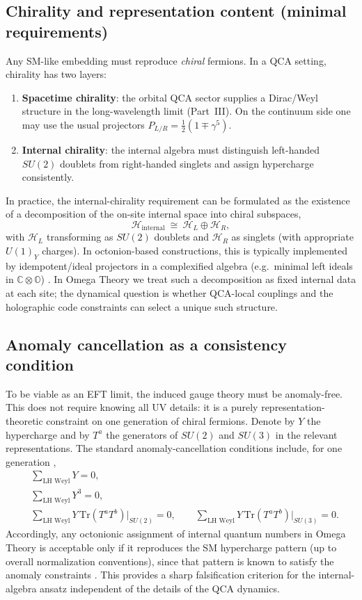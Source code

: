 \subsection{Chirality and representation content (minimal requirements)}
Any SM-like embedding must reproduce \emph{chiral} fermions. In a QCA setting, chirality has two layers:
\begin{enumerate}
    \item \textbf{Spacetime chirality}: the orbital QCA sector supplies a Dirac/Weyl structure in the long-wavelength limit (Part~III). On the continuum side one may use the usual projectors $P_{L/R}=\frac{1}{2}(1\mp\gamma^5)$.
    \item \textbf{Internal chirality}: the internal algebra must distinguish left-handed $SU(2)$ doublets from right-handed singlets and assign hypercharge consistently.
\end{enumerate}
In practice, the internal-chirality requirement can be formulated as the existence of a decomposition of the on-site internal space into chiral subspaces,
\begin{equation}
    \mathcal{H}_{\text{internal}} \ \cong\  \mathcal{H}_{L}\oplus \mathcal{H}_{R},
\end{equation}
with $\mathcal{H}_{L}$ transforming as $SU(2)$ doublets and $\mathcal{H}_{R}$ as singlets (with appropriate $U(1)_Y$ charges). In octonion-based constructions, this is typically implemented by idempotent/ideal projectors in a complexified algebra (e.g.\ minimal left ideals in $\mathbb{C}\otimes\mathbb{O}$) \cite{Furey2017}. In Omega Theory we treat such a decomposition as fixed internal data at each site; the dynamical question is whether QCA-local couplings and the holographic code constraints can select a unique such structure.

\subsection{Anomaly cancellation as a consistency condition}
To be viable as an EFT limit, the induced gauge theory must be anomaly-free. This does not require knowing all UV details: it is a purely representation-theoretic constraint on one generation of chiral fermions. Denote by $Y$ the hypercharge and by $T^a$ the generators of $SU(2)$ and $SU(3)$ in the relevant representations. The standard anomaly-cancellation conditions include, for one generation \cite{PeskinSchroeder1995},
\begin{align}
    &\sum_{\text{LH Weyl}} Y = 0, \\
    &\sum_{\text{LH Weyl}} Y^3 = 0, \\
    &\sum_{\text{LH Weyl}} Y\,\mathrm{Tr}(T^aT^b)\big|_{SU(2)} = 0,\qquad
      \sum_{\text{LH Weyl}} Y\,\mathrm{Tr}(T^aT^b)\big|_{SU(3)} = 0.
\end{align}
Accordingly, any octonionic assignment of internal quantum numbers in Omega Theory is acceptable only if it reproduces the SM hypercharge pattern (up to overall normalization conventions), since that pattern is known to satisfy the anomaly constraints \cite{PeskinSchroeder1995}. This provides a sharp falsification criterion for the internal-algebra ansatz independent of the details of the QCA dynamics.

